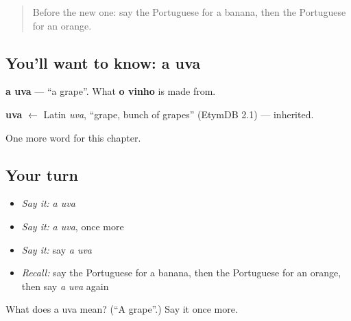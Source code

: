 \begin{quote}
Before the new one: say the Portuguese for a banana, then the Portuguese for an orange.
\end{quote}

\subsection*{You'll want to know: a uva}
\textbf{a uva} — \textquotedblleft{}a grape\textquotedblright{}. What \textbf{o vinho} is made from.

\begin{cousinweb}
\textbf{uva} $\leftarrow$ Latin \emph{uva}, \textquotedblleft{}grape, bunch of grapes\textquotedblright{} (EtymDB 2.1) — inherited.
\end{cousinweb}

\begin{grammarlens}[title={What you've built}]
One more word for this chapter.
\end{grammarlens}

\subsection*{Your turn}
\begin{itemize}
\raggedright
  \item \emph{Say it:} \emph{a uva}
  \item \emph{Say it:} \emph{a uva}, once more
  \item \emph{Say it:} say \emph{a uva}
  \item \emph{Recall:} say the Portuguese for a banana, then the Portuguese for an orange, then say \emph{a uva} again
\end{itemize}

\begin{tcolorbox}[breakable,colback=teal!4,colframe=teal!35!black,title={Before you move on}]
What does a uva mean? (\textquotedblleft{}A grape\textquotedblright{}.) Say it once more.
\end{tcolorbox}
